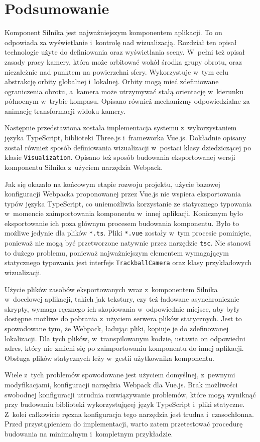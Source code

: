\section{Podsumowanie}

Komponent Silnika jest najważniejszym komponentem aplikacji. To on odpowiada za wyświetlanie i~kontrolę nad wizualizacją. Rozdział ten opisał technologie użyte do definiowania oraz wyświetlania sceny. W~pełni też opisał zasady pracy kamery, która może orbitować wokół środka grupy obrotu, oraz niezależnie nad punktem na powierzchni sfery. Wykorzystuje w~tym celu abstrakcję orbity globalnej i~lokalnej. Orbity mogą mieć zdefiniowane ograniczenia obrotu, a~kamera może utrzymywać stałą orientację w~kierunku północnym w~trybie kompasu. Opisano również mechanizmy odpowiedzialne za animację transformacji widoku kamery.

Następnie przedstawiona została implementacja systemu z~wykorzystaniem języka TypeScript, biblioteki Three.js i~frameworka Vue.js. Dokładnie opisany został również sposób definiowania wizualizacji w~postaci klasy dziedziczącej po klasie \texttt{Visualization}. Opisano też sposób budowania eksportowanej wersji komponentu Silnika z~użyciem narzędzia Webpack.

Jak się okazało na końcowym etapie rozwoju projektu, użycie bazowej konfiguracji Webpacka proponowanej przez Vue.js nie wspiera eksportowania typów języka TypeScript, co uniemożliwia korzystanie ze statycznego typowania w~momencie zaimportowania komponentu w~innej aplikacji. Konicznym było eksportowanie ich poza głównym procesem budowania komponentu. Było to możliwe jedynie dla plików \texttt{*.ts}. Pliki \texttt{*.vue} zostały w~tym procesie pominięte, ponieważ nie mogą być przetworzone natywnie przez narzędzie \texttt{tsc}. Nie stanowi to dużego problemu, ponieważ najważniejszym elementem wymagającym statycznego typowania jest interfejs \texttt{TrackballCamera} oraz klasy przykładowych wizualizacji.

Użycie plików zasobów eksportowanych wraz z~komponentem Silnika w~docelowej aplikacji, takich jak tekstury, czy też ładowane asynchronicznie skrypty, wymaga ręcznego ich skopiowania w~odpowiednie miejsce, aby były dostępne możliwe do pobrania z~użyciem serwera plików statycznych. Jest to spowodowane tym, że Webpack, ładując pliki, kopiuje je do zdefinowanej lokalizacji. Dla tych plików, w~transpilowanym kodzie, ustawia on odpowiedni adres, który nie zmieni się po zaimportowaniu komponentu do innej aplikacji. Obsługa plików statycznych leży w~gestii użytkownika komponentu.

Wiele z~tych problemów spowodowane jest użyciem domyślnej, z~pewnymi modyfikacjami, konfiguracji narzędzia Webpack dla Vue.js. Brak możliwości swobodnej konfiguracji utrudnia rozwiązywanie problemów, które mogą wyniknąć przy budowaniu biblioteki wykorzystującej język TypeScript i~pliki statyczne. Z~kolei całkowicie ręczna konfiguracja tego narzędzia jest trudna i~czasochłonna. Przed przystąpieniem do implementacji, warto zatem przetestować procedurę budowania na minimalnym i~kompletnym przykładzie.
